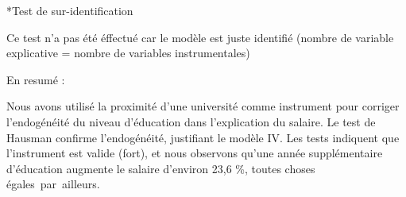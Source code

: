 \documentclass[
  letterpaper,
  DIV=11,
  numbers=noendperiod]{scrartcl}
\begin{document}
*Test de sur-identification

Ce test n'a pas été éffectué car le modèle est juste identifié (nombre
de variable explicative = nombre de variables instrumentales)

En resumé :

Nous avons utilisé la proximité d'une université comme instrument pour
corriger l'endogénéité du niveau d'éducation dans l'explication du
salaire. Le test de Hausman confirme l'endogénéité, justifiant le modèle
IV. Les tests indiquent que l'instrument est valide (fort), et nous
observons qu'une année supplémentaire d'éducation augmente le salaire
d'environ 23,6 \%, toutes choses égales~par~ailleurs.
\end{document}
